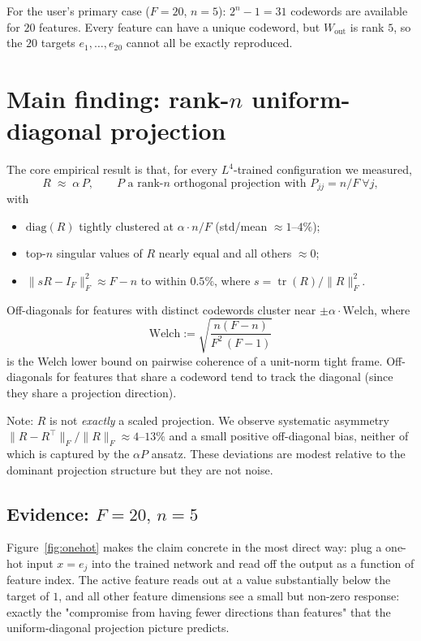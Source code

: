 \documentclass[11pt]{article}
\newcommand{\Weout}{W_{\mathrm{out}}}
\begin{document}
For the user's primary case ($F=20$, $n=5$): $2^n - 1 = 31$ codewords are
available for $20$ features. Every feature can have a unique codeword, but
$\Weout$ is rank $5$, so the $20$ targets $e_1,\ldots,e_{20}$ cannot all be
exactly reproduced.

\section{Main finding: rank-$n$ uniform-diagonal projection}

The core empirical result is that, for every $L^4$-trained configuration we
measured,
\begin{equation}\label{eq:main}
R \;\approx\; \alpha\,P, \qquad P \text{ a rank-}n\text{ orthogonal projection with } P_{jj} = n/F \ \forall j,
\end{equation}
with
\begin{itemize}
\item $\mathrm{diag}(R)$ tightly clustered at $\alpha \cdot n/F$ (std/mean
  $\approx 1\text{--}4\%$);
\item top-$n$ singular values of $R$ nearly equal and all others $\approx 0$;
\item $\|s R - I_F\|_F^2 \approx F - n$ to within $0.5\%$, where
  $s = \operatorname{tr}(R)/\|R\|_F^2$.
\end{itemize}
Off-diagonals for features with distinct codewords cluster near
$\pm\alpha \cdot \mathrm{Welch}$, where
\begin{equation*}
\mathrm{Welch} := \sqrt{\frac{n(F-n)}{F^2\,(F-1)}}
\end{equation*}
is the Welch lower bound on pairwise coherence of a unit-norm tight frame.
Off-diagonals for features that share a codeword tend to track the
diagonal (since they share a projection direction).

Note: $R$ is not \emph{exactly} a scaled projection. We observe systematic
asymmetry $\|R - R^\top\|_F/\|R\|_F \approx 4\text{--}13\%$ and a small
positive off-diagonal bias, neither of which is captured by the
$\alpha P$ ansatz. These deviations are modest relative to the dominant
projection structure but they are not noise.

\subsection{Evidence: $F=20,\,n=5$}

Figure~\ref{fig:onehot} makes the claim concrete in the most direct way:
plug a one-hot input $x = e_j$ into the trained network and read off the
output as a function of feature index. The active feature reads out at a
value substantially below the target of $1$, and all other feature
dimensions see a small but non-zero response: exactly the "compromise from
having fewer directions than features" that the uniform-diagonal
projection picture predicts.
\end{document}
